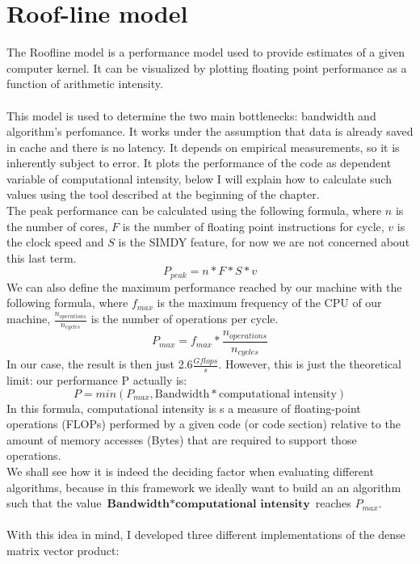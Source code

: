 \documentclass[11pt,a4paper,oneside,titlepage,openright]{book}
\begin{document}
\section{Roof-line model}
The Roofline model is a performance model used to provide estimates of a given computer kernel. 
It can be visualized by plotting floating point performance as a function of arithmetic intensity. \\\\
This model is used to determine the two main bottlenecks: bandwidth and algorithm's perfomance. It works under the assumption that data is already saved in cache and there  is no latency. It depends on empirical measurements, so it is inherently subject to error. 
It plots the performance of the code as dependent variable of computational intensity, below I will explain how to calculate such values using the tool described at the beginning of the chapter. 
\\
The peak performance can be calculated using the following formula, where $n$ is the number of cores, $F$ is the number of floating point instructions for cycle, $v$ is the clock speed and $S$ is the SIMDY feature, for now we are not concerned about this last term. 
$$ P_{peak} = n * F * S * v $$ 
We can also define the maximum performance reached by our machine with the following formula, where $f_{max}$ is the maximum frequency of the CPU of our machine, $\frac{n_{operations}}{n_{cycles}}$ is the number of operations per cycle. 
$$P_{max} = f_{max} * \frac{n_{operations}}{n_{cycles}}$$ 
In our case, the result is then just 2.6$\frac{Gflops}{s}$.
However, this is just the theoretical limit: our performance P actually is: 
$$ P = min(P_{max}, \text{Bandwidth} * \text{computational intensity}) $$
In this formula, computational intensity is s a measure of floating-point operations (FLOPs) performed by a given code (or code section) relative to the amount of memory accesses (Bytes) that are required to support those operations. \\
We shall see how it is indeed the deciding factor when evaluating different algorithms, because in this framework we ideally want to build an an algorithm such that the value $\textbf{Bandwidth} * \textbf{computational intensity}$ reaches $P_{max}$.\\\\
With this idea in mind, I developed three different implementations of the dense matrix vector product:
\end{document}
